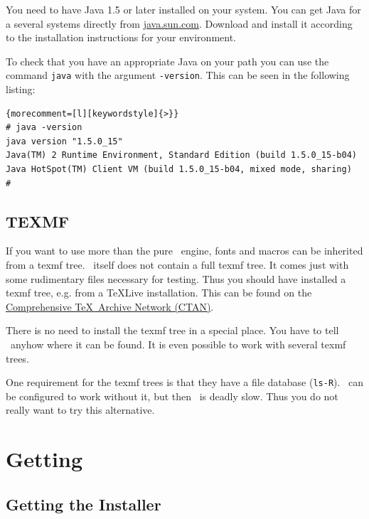 \documentclass{extex-doc}
\makeatletter
\renewcommand\File[1]{\texttt{#1}\index{#1@\textsf{#1}}}
\makeatother
\begin{document}
You need to have Java 1.5 or later installed on your
system. You can get Java for a several systems directly from
\url{java.sun.com}. Download and install it according to the
installation instructions for your environment.

To check that you have an appropriate Java on your path you can use
the command \texttt{java} with the argument \texttt{-version}. This
can be seen in the following listing:

%
\begin{lstlisting}{morecomment=[l][keywordstyle]{>}}
# java -version
java version "1.5.0_15"
Java(TM) 2 Runtime Environment, Standard Edition (build 1.5.0_15-b04)
Java HotSpot(TM) Client VM (build 1.5.0_15-b04, mixed mode, sharing)
#
\end{lstlisting}


\subsection{TEXMF}

If you want to use more than the pure \ExTeX\ engine, fonts and macros
can be inherited from a texmf tree. \ExTeX\ itself does
not contain a full texmf tree. It comes just with some rudimentary
files necessary for testing. Thus you should have installed a texmf
tree, e.g. from a \TeX Live installation.
This can be found on the \href{http://www.ctan.org}{Comprehensive
  \TeX\ Archive Network (CTAN)}.

There is no need to install the texmf tree in a special place. You
have to tell \ExTeX\ anyhow where it can be found. It is even possible
to work with several texmf trees.

One requirement for the texmf trees is that they have a file database
(\File{ls-R}). \ExTeX\ can be configured to work without it, but then
\ExTeX\ is deadly slow. Thus you do not really want to try this
alternative.


\section{Getting \ExTeX}

\subsection{Getting the Installer}
\end{document}

